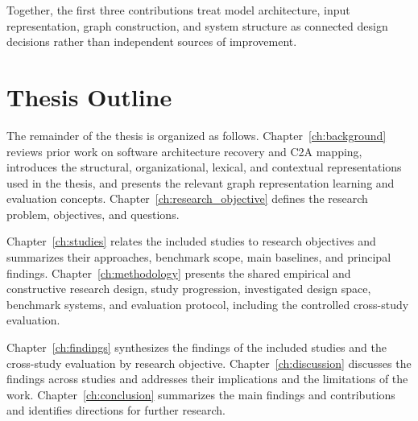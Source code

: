 \noindent Together, the first three contributions treat model architecture, input representation, graph construction, and system structure as connected design decisions rather than independent sources of improvement.

\section{Thesis Outline \label{sec:thesis-outline}}

The remainder of the thesis is organized as follows. Chapter~\ref{ch:background} reviews prior work on software architecture recovery and C2A mapping, introduces the structural, organizational, lexical, and contextual representations used in the thesis, and presents the relevant graph representation learning and evaluation concepts. Chapter~\ref{ch:research_objective} defines the research problem, objectives, and questions.

Chapter~\ref{ch:studies} relates the included studies to research objectives and summarizes their approaches, benchmark scope, main baselines, and principal findings. Chapter~\ref{ch:methodology} presents the shared empirical and constructive research design, study progression, investigated design space, benchmark systems, and evaluation protocol, including the controlled cross-study evaluation.


Chapter~\ref{ch:findings} synthesizes the findings of the included studies and the cross-study evaluation by research objective. Chapter~\ref{ch:discussion} discusses the findings across studies and addresses their implications and the limitations of the work. Chapter~\ref{ch:conclusion} summarizes the main findings and contributions and identifies directions for further research.

